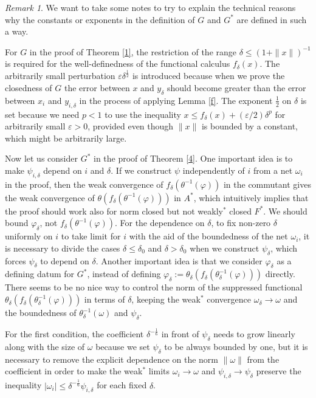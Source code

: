 \documentclass[noamsfonts,a4paper,10pt]{amsart}
\theoremstyle{plain}
\theoremstyle{definition}
\theoremstyle{remark}
\newtheorem{rmk}[thm]{Remark}
\begin{document}
\begin{rmk}
We want to take some notes to try to explain the technical reasons why the constants or exponents in the definition of $G$ and $G^*$ are defined in such a way.

For $G$ in the proof of Theorem \ref{1}, the restriction of the range $\delta\le(1+\|x\|)^{-1}$ is required for the well-definedness of the functional calculus $f_\delta(x)$.
The arbitrarily small perturbation $\varepsilon\delta^{\frac12}$ is introduced because when we prove the closedness of $G$ the error between $x$ and $y_\delta$ should become greater than the error between $x_i$ and $y_{i,\delta}$ in the process of applying Lemma \ref{f}.
The exponent $\frac12$ on $\delta$ is set because we need $p<1$ to use the inequality $x\le f_\delta(x)+(\varepsilon/2)\delta^p$ for arbitrarily small $\varepsilon>0$, provided even though $\|x\|$ is bounded by a constant, which might be arbitrarily large.

Now let us consider $G^*$ in the proof of Theorem \ref{4}.
One important idea is to make $\psi_{i,\delta}$ depend on $i$ and $\delta$.
If we construct $\psi$ independently of $i$ from a net $\omega_i$ in the proof, then the weak convergence of $f_\delta(\theta^{-1}(\varphi))$ in the commutant gives the weak convergence of $\theta(f_\delta(\theta^{-1}(\varphi)))$ in $A^*$, which intuitively implies that the proof should work also for norm closed but not weakly$^*$ closed $F^*$.
We should bound $\varphi_\delta$, not $f_\delta(\theta^{-1}(\varphi))$.
For the dependence on $\delta$, to fix non-zero $\delta$ uniformly on $i$ to take limit for $i$ with the aid of the boundedness of the net $\omega_i$, it is necessary to divide the cases $\delta\le\delta_0$ and $\delta>\delta_0$ when we construct $\psi_\delta$, which forces $\psi_\delta$ to depend on $\delta$.
Another important idea is that we consider $\varphi_\delta$ as a defining datum for $G^*$, instead of defining $\varphi_\delta:=\theta_\delta(f_\delta(\theta_\delta^{-1}(\varphi)))$ directly.
There seems to be no nice way to control the norm of the suppressed functional $\theta_\delta(f_\delta(\theta_\delta^{-1}(\varphi)))$ in terms of $\delta$, keeping the weak$^*$ convergence $\omega_\delta\to\omega$ and the boundedness of $\theta_\delta^{-1}(\omega)$ and $\psi_\delta$.

For the first condition, the coefficient $\delta^{-\frac16}$ in front of $\psi_\delta$ needs to grow linearly along with the size of $\omega$ because we set $\psi_\delta$ to be always bounded by one, but it is necessary to remove the explicit dependence on the norm $\|\omega\|$ from the coefficient in order to make the weak$^*$ limits $\omega_i\to\omega$ and $\psi_{i,\delta}\to\psi_\delta$ preserve the inequality $|\omega_i|\le\delta^{-\frac16}\psi_{i,\delta}$ for each fixed $\delta$.


\end{rmk}
\end{document}
